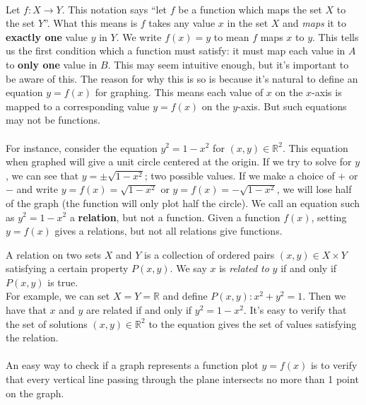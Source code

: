 \documentclass[12pt, a4paper, titlepage, twoside]{article}
\newcommand*{\R}{\mathbb{R}}
\begin{document}
	\paragraph{}
	Let $f : X \to Y$. This notation says ``let $f$ be a function which maps the set $X$ to the set $Y$''. What this means is $f$ takes any value
	$x$ in the set $X$ and \textit{maps} it to \textbf{exactly one} value $y$ in $Y$. We write $f(x) = y$ to mean $f$ maps $x$ to $y$. 
	This tells us the first condition which a function must satisfy: it must
	map each value in $A$ to \textbf{only one} value in $B$. This may seem intuitive enough, but it's important to be aware of this. The reason
	for why this is so is because it's natural to define an equation $y = f(x)$ for graphing. This means each value of $x$ on the $x$-axis is mapped
	to a corresponding value $y = f(x)$ on the $y$-axis. But such equations may not be functions. 

	\paragraph{}	
	For instance, consider the equation $y^2 = 1-x^2$ for $(x,y) \in \R^2$. This equation when graphed will give a unit circle centered at the 
	origin. If we try to
	solve for $y$, we can see that $y = \pm \sqrt{1-x^2}$; two possible values. If we make a choice of $+$ or $-$ and write $y = f(x) = 
	\sqrt{1-x^2}$ or $y = f(x) = -\sqrt{1-x^2}$, we will lose half of the graph (the function will only plot half the circle). We call an equation
	such as $y^2 = 1-x^2$ a \textbf{relation}, but not a function. Given a function $f(x)$, setting $y=f(x)$ gives a relations, but not all relations
	give functions.\\
	
	\begin{kp}[Relations]
		A relation on two sets $X$ and $Y$ is a collection of ordered pairs $(x,y) \in X \times Y$ satisfying a certain property $P(x,y)$.
		We say $x$ is \textit{related to} $y$ if and only if $P(x,y)$ is true.\\
		
		For example, we can set $X = Y = \R$ and define $P(x,y): x^2+y^2=1$. Then we have that $x$ and $y$ are related if and only if
		$y^2 = 1-x^2$. It's easy to verify that the set of solutions $(x,y) \in \R^2$ to the equation gives the set of values satisfying the relation.
	\end{kp}
	
	\paragraph{}
	An easy way to check if a graph represents a function plot $y = f(x)$ is to verify that every vertical line passing through the plane intersects
	no more than 1 point on the graph. 
	
\end{document}
